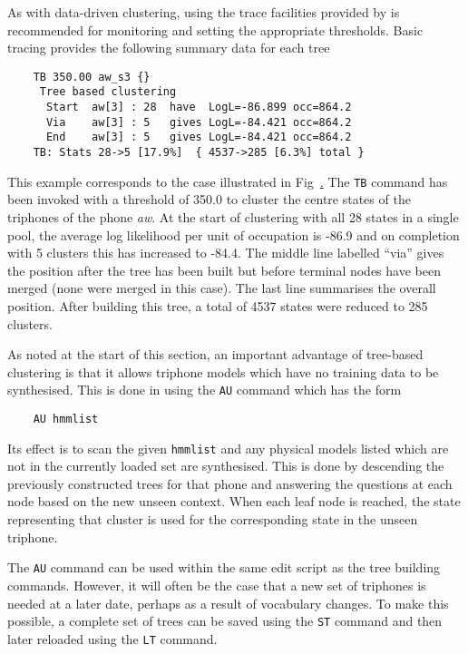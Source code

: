 As with data-driven clustering, using the trace facilities provided by
 is recommended for monitoring and setting the appropriate thresholds.
Basic tracing provides the following summary data for each tree
\begin{verbatim}
    TB 350.00 aw_s3 {}
     Tree based clustering
      Start  aw[3] : 28  have  LogL=-86.899 occ=864.2
      Via    aw[3] : 5   gives LogL=-84.421 occ=864.2
      End    aw[3] : 5   gives LogL=-84.421 occ=864.2
    TB: Stats 28->5 [17.9%]  { 4537->285 [6.3%] total }
\end{verbatim}
This example corresponds to the case illustrated in Fig~\href{f:qstree}.
The \texttt{TB}
command has been invoked with a  threshold of 350.0 to cluster
the centre states of the triphones of the phone \textit{aw}.
At the start of clustering with all 28 states in a single pool, the average
log likelihood per unit of occupation is -86.9 and on completion with
5 clusters this has increased to -84.4.  The middle line labelled ``via'' gives
the position after the tree has been built but before terminal nodes have been
merged (none were merged in this case).  The last line summarises the overall
position.  After building this tree, a total of 4537 states were reduced
to 285 clusters.

As noted at the start of this section, an important advantage of tree-based clustering
is that it allows triphone models which have no training data to be synthesised.
This is done in  using the \texttt{AU} command which has the form
\begin{verbatim}
    AU hmmlist
\end{verbatim}
Its effect is to scan the given \texttt{hmmlist} and any physical models listed
which are not in the currently loaded set are synthesised.  This is done 
by descending the previously constructed trees for that phone and answering the
questions at each node based on the new unseen context.  When each leaf node is
reached, the state representing that cluster is used for the corresponding state
in the unseen triphone.

The \texttt{AU} command can be used within the same edit script as the tree building
commands.  However, it will often be the case that a new set of triphones is needed
at a later date, perhaps as a result of vocabulary changes.  To make this possible,
a complete set of trees can be saved using the \texttt{ST} 
command and then later
reloaded using the \texttt{LT} command.

